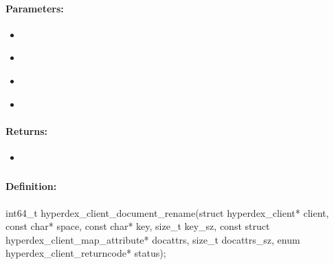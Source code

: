 \paragraph{Parameters:}
\begin{itemize}[noitemsep]
\item {}\\

\item {}\\

\item {}\\

\item {}\\

\end{itemize}

\paragraph{Returns:}
\begin{itemize}[noitemsep]
\item {}\\

\end{itemize}

\pagebreak
\subsubsection{}
\label{api:c:document_rename}


\paragraph{Definition:}
\begin{ccode}
int64_t hyperdex_client_document_rename(struct hyperdex_client* client,
        const char* space,
        const char* key, size_t key_sz,
        const struct hyperdex_client_map_attribute* docattrs, size_t docattrs_sz,
        enum hyperdex_client_returncode* status);
\end{ccode}

